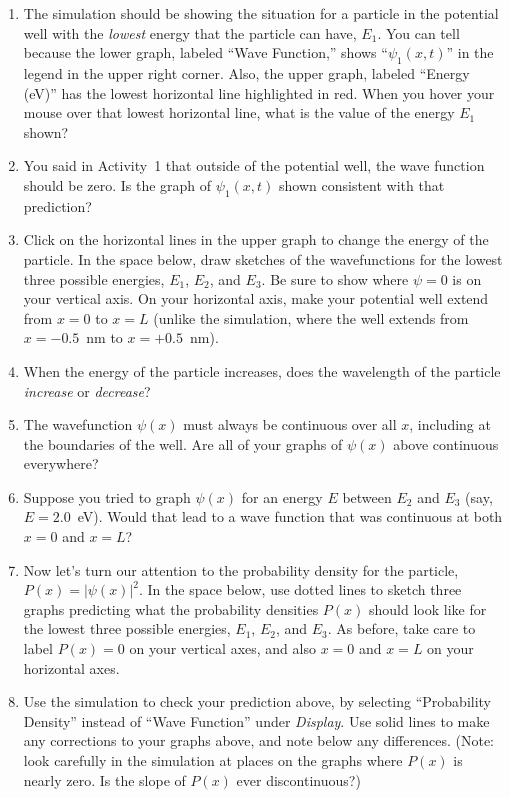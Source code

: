 \begin{enumerate}[wide]
\item The simulation should be showing the situation for a particle in the potential well with the \textit{lowest} energy that the particle can have, $E_1$.  You can tell because the lower graph, labeled ``Wave Function,'' shows ``$\psi_1(x,t)$'' in the legend in the upper right corner.  Also, the upper graph, labeled ``Energy (eV)'' has the lowest horizontal line highlighted in red.  When you hover your mouse over that lowest horizontal line, what is the value of the energy $E_1$ shown?
\answerspace{0.5in}

\item You said in Activity~1 that outside of the potential well, the wave function should be zero.  Is the graph of $\psi_1(x,t)$ shown consistent with that prediction?
\answerspace{0.3in}


\item Click on the horizontal lines in the upper graph to change the energy of the particle.  In the space below, draw  sketches of the wavefunctions for the lowest three possible energies, $E_1$, $E_2$, and $E_3$.  Be sure to show where $\psi = 0$ is on your vertical axis.  On your horizontal axis, make your potential well extend from $x=0$ to $x=L$ (unlike the simulation, where the well extends from $x = -0.5$~nm to $x=+0.5$~nm). 
\vfill

\item When the energy of the particle increases, does the wavelength of the particle \textit{increase} or \textit{decrease}?
\answerspace{0.3in}

\item The wavefunction $\psi(x)$ must always be continuous over all $x$, including at the boundaries of the well.  Are all of your graphs of $\psi(x)$ above continuous everywhere?
\answerspace{0.3in}

\item Suppose you tried to graph $\psi(x)$ for an energy $E$ between $E_2$ and $E_3$ (say, $E=2.0$~eV).  Would that lead to a wave function that was continuous at both $x=0$ and $x=L$?
\answerspace{0.3in}

\item Now let's turn our attention to the probability density for the particle, $P(x)=\left|\psi(x)\right|^2$.  In the space below, use dotted lines to sketch three graphs predicting what the probability densities $P(x)$ should look like for the lowest three possible energies, $E_1$, $E_2$, and $E_3$.  As before, take care to label $P(x)=0$ on your vertical axes, and also $x=0$ and $x=L$ on your horizontal axes.
\answerspace{2.0in}


\pagebreak

\item Use the simulation to check your prediction above, by selecting ``Probability Density'' instead of ``Wave Function'' under \textit{Display}.  Use solid lines to make any corrections to your graphs above, and note below any differences.  (Note: look carefully in the simulation at places on the graphs where $P(x)$ is nearly zero.  Is the slope of $P(x)$ ever discontinuous?)
\answerspace{0.5in}
\end{enumerate}


